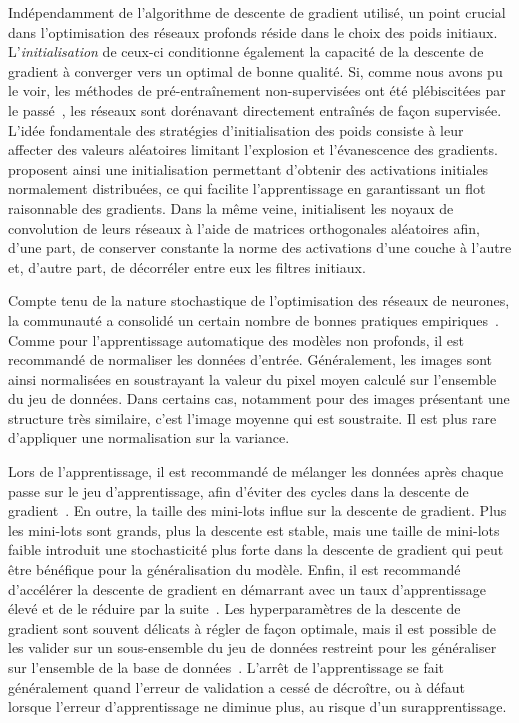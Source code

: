 Indépendamment de l'algorithme de descente de gradient utilisé, un point crucial dans l'optimisation des réseaux profonds réside dans le choix des poids initiaux. L'\emph{initialisation} de ceux-ci conditionne également la capacité de la descente de gradient à converger vers un optimal de bonne qualité. Si, comme nous avons pu le voir, les méthodes de pré-entraînement non-supervisées ont été plébiscitées par le passé~\cite{hinton_fast_2006,bengio_greedy_2007}, les réseaux sont dorénavant directement entraînés de façon supervisée. L'idée fondamentale des stratégies d'initialisation des poids consiste à leur affecter des valeurs aléatoires limitant l'explosion et l'évanescence des gradients. \citet{glorot_understanding_2010,he_delving_2015} proposent ainsi une initialisation permettant d'obtenir des activations initiales normalement distribuées, ce qui facilite l'apprentissage en garantissant un flot raisonnable des gradients. Dans la même veine, \citet{saxe_exact_2013} initialisent les noyaux de convolution de leurs réseaux à l'aide de matrices orthogonales aléatoires afin, d'une part, de conserver constante la norme des activations d'une couche à l'autre et, d'autre part, de décorréler entre eux les filtres initiaux.

Compte tenu de la nature stochastique de l'optimisation des réseaux de neurones, la communauté a consolidé un certain nombre de bonnes pratiques empiriques~\cite{lecun_efficient_1998,bengio_practical_2012,bottou_stochastic_2012}. Comme pour l'apprentissage automatique des modèles non profonds, il est recommandé de normaliser les données d'entrée. Généralement, les images sont ainsi normalisées en soustrayant la valeur du pixel moyen calculé sur l'ensemble du jeu de données. Dans certains cas, notamment pour des images présentant une structure très similaire, c'est l'image moyenne qui est soustraite. Il est plus rare d'appliquer une normalisation sur la variance.

Lors de l'apprentissage, il est recommandé de mélanger les données après chaque passe sur le jeu d'apprentissage, afin d'éviter des cycles dans la descente de gradient~\cite{lecun_efficient_1998}. En outre, la taille des mini-lots influe sur la descente de gradient. Plus les mini-lots sont grands, plus la descente est stable, mais une taille de mini-lots faible introduit une stochasticité plus forte dans la descente de gradient qui peut être bénéfique pour la généralisation du modèle. Enfin, il est recommandé d'accélérer la descente de gradient en démarrant avec un taux d'apprentissage élevé et de le réduire par la suite~\cite{bengio_practical_2012}. Les hyperparamètres de la descente de gradient sont souvent délicats à régler de façon optimale, mais il est possible de les valider sur un sous-ensemble du jeu de données restreint pour les généraliser sur l'ensemble de la base de données~\cite{bottou_stochastic_2012}. L'arrêt de l'apprentissage se fait généralement quand l'erreur de validation a cessé de décroître, ou à défaut lorsque l'erreur d'apprentissage ne diminue plus, au risque d'un surapprentissage.

